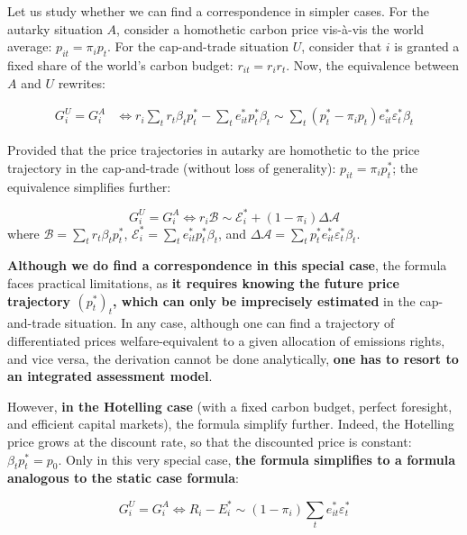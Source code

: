 \documentclass[12pt,english]{article}
\begin{document}
Let us study whether we can find a correspondence in simpler cases. For
the autarky situation $A$, consider a homothetic carbon price
vis-à-vis the world average: $p_{it}=\pi_i p_t$. For the cap-and-trade
situation $U$, consider that $i$ is granted a fixed share of the
world's carbon budget: $r_{it}=r_ir_t$. Now, the equivalence between
$A$ and $U$ rewrites:

$$\begin{aligned}
G^U_i = G^A_i &\Leftrightarrow r_i \sum_t r_{t} \beta_t p^*_t - \sum_t e^*_{it} p^*_t \beta_t \sim \sum_t (p^*_t - \pi_i p_t) e^*_{it}  \varepsilon^*_t \beta_t  
\end{aligned}$$

Provided that the price trajectories in autarky are homothetic to the
price trajectory in the cap-and-trade (without loss of generality):
$p_{it}=\pi_i p^*_t$; the equivalence simplifies further:

$$G^U_i = G^A_i \Leftrightarrow r_i \mathscr{B} \sim \mathscr{E}^*_i + (1 - \pi_i) \Delta \mathscr{A}$$
where $\mathscr{B} = \sum_t r_{t} \beta_t p^*_t$,
$\mathscr{E}^*_i = \sum_t e^*_{it} p^*_t \beta_t$, and
$\Delta \mathscr{A} = \sum_t p^*_t e^*_{it}  \varepsilon^*_t \beta_t $.

\textbf{Although we do find a correspondence in this special case}, the
formula faces practical limitations, as \textbf{it requires knowing the
future price trajectory $(p^*_t)_t$, which can only be imprecisely
estimated} in the cap-and-trade situation. In any case, although one can
find a trajectory of differentiated prices welfare-equivalent to a given
allocation of emissions rights, and vice versa, the derivation cannot be
done analytically, \textbf{one has to resort to an integrated assessment
model}.

However, \textbf{in the Hotelling case} (with a fixed carbon budget,
perfect foresight, and efficient capital markets), the formula simplify
further. Indeed, the Hotelling price grows at the discount rate, so that
the discounted price is constant: $\beta_t p^*_t = p_0$. Only in this
very special case, \textbf{the formula simplifies to a formula analogous
to the static case formula}:

$$G^U_i = G^A_i \Leftrightarrow R_i - E^*_i \sim (1 - \pi_i) \sum_t e^*_{it}  \varepsilon^*_t$$
\end{document}
